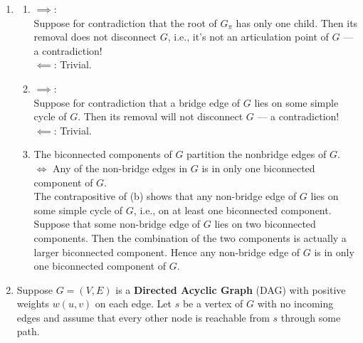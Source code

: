 \documentclass[12pt,a4paper]{article}
\makeatletter
\newtheorem*{solution}{Solution}
\theoremstyle{definition}
\renewenvironment{solution}[1][Solution] {\par\pushQED{\qed}\normalfont\topsep6\p@\@plus6\p@\relax\trivlist\item[\hskip\labelsep\bfseries#1\@addpunct{.}]\ignorespaces}{\popQED\endtrivlist\@endpefalse} \makeatother
\makeatother
\begin{document}
\begin{enumerate}
	\begin{solution}
		\hfill
		\begin{enumerate}
			\item 
			$\implies$: \\
			Suppose for contradiction that the root of $G_{\pi}$ has only one child. Then its removal does not disconnect $G$, i.e., it's not an articulation point of $G$ --- a contradiction! \\
			$\impliedby$: Trivial.
			\item
			$\implies$: \\
			Suppose for contradiction that a bridge edge of $G$ lies on some simple cycle of $G$. Then its removal will not disconnect $G$ --- a contradiction! \\
			$\impliedby$: Trivial.
			\item
			The biconnected components of $G$ partition the nonbridge edges of $G$. $\iff$ Any of the non-bridge edges in $G$ is in only one biconnected component of $G$. \\
			The contrapositive of (b) shows that any non-bridge edge of $G$ lies on some simple cycle of $G$, i.e., on at least one biconnected component. \\
			Suppose that some non-bridge edge of $G$ lies on two biconnected components. Then the combination of the two components is actually a larger biconnected component. Hence any non-bridge edge of $G$ is in only one biconnected component of $G$. 
		\end{enumerate}
	\end{solution}
    \item
    Suppose $G=(V, E)$ is a \textbf{Directed Acyclic Graph} (DAG) with positive weights $w(u, v)$ on each edge. Let $s$ be a vertex of $G$ with no incoming edges and assume that every other node is reachable from $s$ through some path.
    

\end{enumerate}
\end{document}
